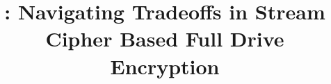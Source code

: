 \documentclass[letterpaper,twocolumn,10pt]{article}
\begin{document}
\title{\sys{}: Navigating Tradeoffs in Stream Cipher Based Full Drive Encryption}

\date{}
\maketitle






%







\pagebreak




\end{document}
